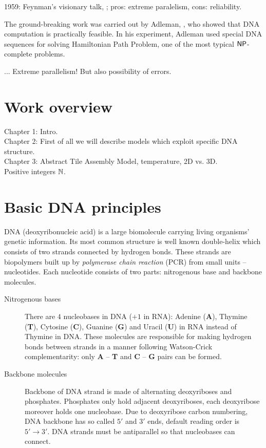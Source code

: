 	
	1959: Feynman's visionary talk, \cite{feynman}; pros: extreme paralelism, cons: reliability.
	
	The ground-breaking work was carried out by Adleman, \cite{adleman94}, who showed that DNA computation is practically feasible. In his experiment, Adleman used special DNA sequences for solving Hamiltonian Path Problem, one of the most typical $\mathsf{NP}$-complete problems.
	
	... Extreme parallelism! But also possibility of errors.

\section*{Work overview}
	
	
	Chapter 1: Intro.\\
	Chapter 2: First of all we will describe models which exploit specific DNA structure.\\
	Chapter 3: Abstract Tile Assembly Model, temperature, 2D vs. 3D.\\
	Positive integers $\mathbb{N}$. 
	

\section{Basic DNA principles}
	
	DNA (deoxyribonucleic acid) is a large biomolecule carrying living organisms' genetic information. Its most common structure is well known double-helix which consists of two strands connected by hydrogen bonds. These strands are biopolymers built up by {\em polymerase chain reaction} (PCR) from small units -- nucleotides. Each nucleotide consists of two parts: nitrogenous base and backbone molecules.
	\begin{description}
		\item[Nitrogenous bases] There are $4$ nucleobases in DNA ($+1$ in RNA): Adenine ({\bf A}), Thymine ({\bf T}), Cytosine ({\bf C}), Guanine ({\bf G}) and Uracil ({\bf U}) in RNA instead of Thymine in DNA. These molecules are responsible for making hydrogen bonds between strands in a manner following Watson-Crick complementarity: only {\bf A} -- {\bf T} and {\bf C} -- {\bf G} pairs can be formed.
		\item[Backbone molecules] Backbone of DNA strand is made of alternating deoxyriboses and phosphates. Phosphates only hold adjacent deoxyriboses, each deoxyribose moreover holds one nucleobase. Due to deoxyribose carbon numbering, DNA backbone has so called $5'$ and $3'$ ends, default reading order is $5'\rightarrow 3'$. DNA strands must be antiparallel so that nucleobases can connect.
	\end{description}

